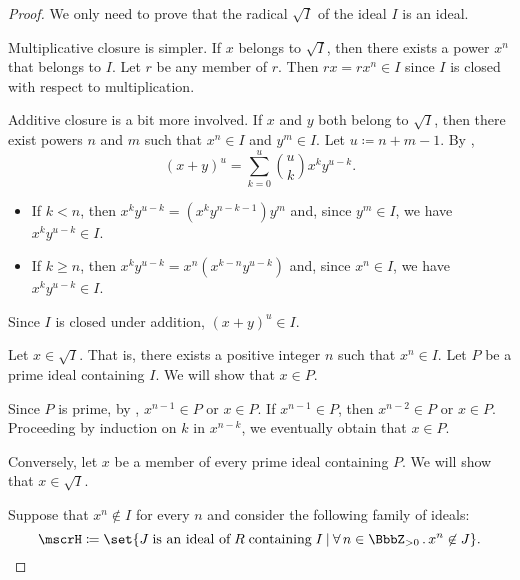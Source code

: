 \begin{proof}
   We only need to prove that the radical \( \sqrt I \) of the ideal \( I \) is an ideal.

  Multiplicative closure is simpler. If \( x \) belongs to \( \sqrt I \), then there exists a power \( x^n \) that belongs to \( I \). Let \( r \) be any member of \( r \). Then \( rx = rx^n \in I \) since \( I \) is closed with respect to multiplication.

  Additive closure is a bit more involved. If \( x \) and \( y \) both belong to \( \sqrt I \), then there exist powers \( n \) and \( m \) such that \( x^n \in I \) and \( y^m \in I \). Let \( u \coloneqq n + m - 1 \). By ,
  \begin{equation*}
    (x + y)^u = \sum_{k=0}^u \binom u k x^k y^{u-k}.
  \end{equation*}

  \begin{itemize}
    \item If \( k < n \), then \( x^k y^{u-k} = (x^k y^{n - k - 1}) y^m \) and, since \( y^m \in I \), we have \( x^k y^{u-k} \in I \).
    \item If \( k \geq n \), then \( x^k y^{u-k} = x^n (x^{k-n} y^{u-k}) \) and, since \( x^n \in I \), we have \( x^k y^{u-k} \in I \).
  \end{itemize}

  Since \( I \) is closed under addition, \( (x + y)^u \in I \).

   Let \( x \in \sqrt I \). That is, there exists a positive integer \( n \) such that \( x^n \in I \). Let \( P \) be a prime ideal containing \( I \). We will show that \( x \in P \).

  Since \( P \) is prime, by , \( x^{n-1} \in P \) or \( x \in P \). If \( x^{n-1} \in P \), then \( x^{n-2} \in P \) or \( x \in P \). Proceeding by induction on \( k \) in \( x^{n-k} \), we eventually obtain that \( x \in P \).

   Conversely, let \( x \) be a member of every prime ideal containing \( P \). We will show that \( x \in \sqrt I \).

  Suppose that \( x^n \not\in I \) for every \( n \) and consider the following family of ideals:
  \begin{equation*}
    \mscrH \coloneqq \set{ J \T{is an ideal of} R \T{containing} I \given \qforall {n \in \BbbZ_{>0}} x^n \not\in J }.
  \end{equation*}


\end{proof}
